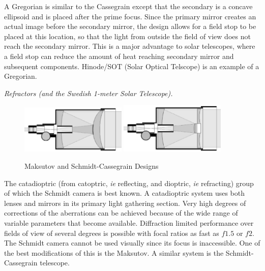 A Gregorian is similar to the Cassegrain except that the secondary is a
concave ellipsoid and is placed after the prime focus. Since the primary 
mirror creates an actual image before the secondary mirror, the design
allows for a field stop to be placed at this location, so that the light from outside
the field of view does not reach the secondary mirror. This is a major advantage
to solar telescopes, where a field stop can reduce the amount of heat reaching secondary
mirror and subsequent components. Hinode/SOT (Solar Optical Telscope) is an 
example of a Gregorian.

{\it Refractors (and the Swedish 1-meter Solar Telescope).}

\begin{figure}[th!]
	\centering
	\includegraphics[width=0.45\textwidth]{maksutovcassegraindetailed.eps}
	\includegraphics[width=0.45\textwidth]{schmidtcassegraindetailed.eps}
  \caption{Maksutov and Schmidt-Cassegrain Designs}
  \label{fig:catadiotropic}
\end{figure}

The catadioptric (from catoptric, {\it ie} reflecting, and dioptric, {\it ie} 
refracting) group of which the Schmidt camera is best known. A catadioptric 
system uses both lenses and mirrors in its primary light gathering section.
Very high degrees of corrections of the aberrations can be achieved because
of the wide range of variable parameters that become available. Diffraction
limited performance over fields of view of several degrees is possible with
focal ratios as fast as $f1.5$ or $f2$. The Schmidt
camera cannot be used visually since its focus is inaccessible. One of the best
modifications of this is the Maksutov. A similar system is the 
Schmidt-Cassegrain telescope. 

